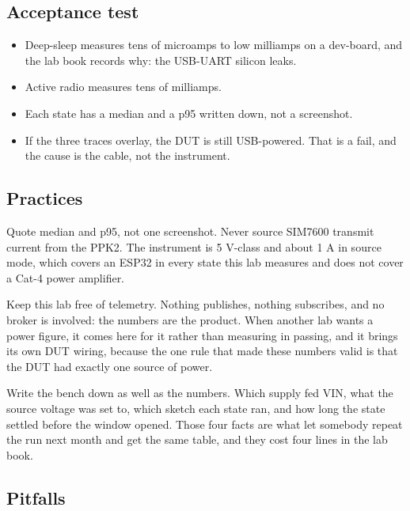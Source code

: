 \subsection*{Acceptance test}

\begin{itemize}
\item Deep-sleep measures tens of microamps to low milliamps on a dev-board, and the lab
book records why: the USB-UART silicon leaks.
\item Active radio measures tens of milliamps.
\item Each state has a median and a p95 written down, not a screenshot.
\item If the three traces overlay, the DUT is still USB-powered. That is a fail, and the
cause is the cable, not the instrument.
\end{itemize}

\subsection*{Practices}

Quote median and p95, not one screenshot. Never source SIM7600 transmit current from the
PPK2. The instrument is 5 V-class and about 1 A in source mode, which covers an ESP32 in
every state this lab measures and does not cover a Cat-4 power amplifier.

Keep this lab free of telemetry. Nothing publishes, nothing subscribes, and no broker is
involved: the numbers are the product. When another lab wants a power figure, it comes here
for it rather than measuring in passing, and it brings its own DUT wiring, because the one
rule that made these numbers valid is that the DUT had exactly one source of power.

Write the bench down as well as the numbers. Which supply fed VIN, what the source voltage
was set to, which sketch each state ran, and how long the state settled before the window
opened. Those four facts are what let somebody repeat the run next month and get the same
table, and they cost four lines in the lab book.

\subsection*{Pitfalls}

